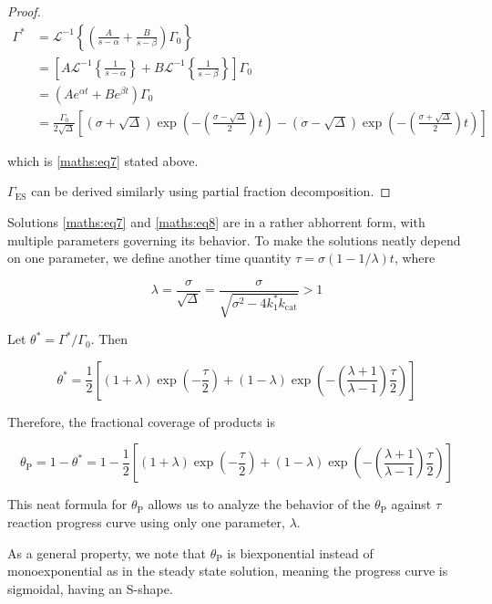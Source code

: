 \documentclass{article}
\newcommand{\GES}{\Gamma_{\text{ES}}}
\newcommand{\kcat}{k_{\text{cat}}}
\newcommand{\thetaP}{\theta_{\text{P}}}
\begin{document}
\begin{proof}
    \begin{align*}
        \Gamma^* &= \mathcal{L}^{-1}\left\{ \left( \frac{A}{s - \alpha}  + \frac{B}{s - \beta} \right) \Gamma_0 \right\} \\[5pt]
        &= \left[ A \mathcal{L}^{-1}\left\{ \frac{1}{s - \alpha} \right\} + B \mathcal{L}^{-1}\left\{ \frac{1}{s- \beta} \right\} \right] \Gamma_0 \\[5pt]
        &= \left( A e^{\alpha t} + B e^{\beta t} \right) \Gamma_0 \\[5pt]
        &= \frac{\Gamma_0}{2 \sqrt{\Delta}} \left[ (\sigma + \sqrt{\Delta}) \exp\left( - \left( \frac{\sigma - \sqrt{\Delta}}{2} \right) t \right) - (\sigma - \sqrt{\Delta}) \exp\left( - \left( \frac{\sigma + \sqrt{\Delta}}{2} \right) t \right) \right]
    \end{align*}

    which is \eqref{maths:eq7} stated above.

    $\GES$ can be derived similarly using partial fraction decomposition.
\end{proof}

Solutions \eqref{maths:eq7} and \eqref{maths:eq8} are in a rather abhorrent form, with multiple parameters governing its behavior. To make the solutions neatly depend on one parameter, we define another time quantity $\tau = \sigma (1 - 1 / \lambda) t$, where

\[
\lambda = \frac{\sigma}{\sqrt{\Delta}} = \frac{\sigma}{\sqrt{\sigma^2 - 4 k_1^* \kcat}} > 1
\]

Let $\theta^* = \Gamma^* / \Gamma_0$. Then

\[
\theta^* = \frac{1}{2}\left[ (1 + \lambda) \exp\left( -\frac{\tau}{2} \right) + (1 - \lambda) \exp\left( -\left( \frac{\lambda + 1}{\lambda - 1} \right)\frac{\tau}{2} \right) \right]
\]

Therefore, the fractional coverage of products is \cite{annedemaille12}

\begin{equation}\label{maths:eq9}
\thetaP = 1 - \theta^* = 1 - \frac{1}{2}\left[ (1 + \lambda) \exp\left( -\frac{\tau}{2} \right) + (1 - \lambda) \exp\left( -\left( \frac{\lambda + 1}{\lambda - 1} \right)\frac{\tau}{2} \right) \right]
\end{equation}

This neat formula for $\thetaP$ allows us to analyze the behavior of the $\thetaP$ against $\tau$ reaction progress curve using only one parameter, $\lambda$.

As a general property, we note that $\thetaP$ is biexponential instead of monoexponential as in the steady state solution, meaning the progress curve is sigmoidal, having an S-shape. 
\end{document}
